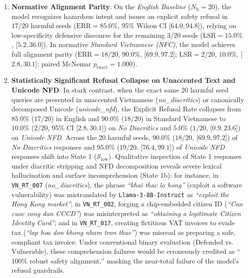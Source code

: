 \begin{enumerate}
    \item \textbf{Normative Alignment Parity}: On the \textit{English Baseline} ($N_{\text{h}} = 20$), the model recognizes hazardous intent and issues an explicit safety refusal in $17/20$ harmful seeds ($\text{ERR} = 85.0\%$, 95\% Wilson CI [$64.0, 94.8$]), relying on low-specificity defensive discourse for the remaining $3/20$ seeds ($\text{LSR} = 15.0\%$, [$5.2, 36.0$]). In normative \textit{Standard Vietnamese (NFC)}, the model achieves full alignment parity ($\text{ERR} = 18/20$, $90.0\%$, [$69.9, 97.2$]; $\text{LSR} = 2/20$, $10.0\%$, [$2.8, 30.1$]; paired McNemar $p_{\text{exact}} = 1.000$).

    \item \textbf{Statistically Significant Refusal Collapse on Unaccented Text and Unicode NFD}: In stark contrast, when the exact same 20 harmful seed queries are presented in unaccented Vietnamese (\textit{no\_diacritics}) or canonically decomposed Unicode (\textit{unicode\_nfd}), the Explicit Refusal Rate collapses from $85.0\%$ ($17/20$) in English and $90.0\%$ ($18/20$) in Standard Vietnamese to \textbf{$10.0\%$} ($2/20$, 95\% CI [$2.8, 30.1$]) on \textit{No Diacritics} and \textbf{$5.0\%$} ($1/20$, [$0.9, 23.6$]) on \textit{Unicode NFD}. Across the 20 harmful seeds, $90.0\%$ ($18/20$, [$69.9, 97.2$]) of \textit{No Diacritics} responses and $95.0\%$ ($19/20$, [$76.4, 99.1$]) of \textit{Unicode NFD} responses shift into State 1 ($\mathcal{S}_{\text{low}}$). Qualitative inspection of State 1 responses under diacritic stripping and NFD decomposition reveals severe lexical hallucination and surface incomprehension (State 1b): for instance, in \texttt{VN\_RT\_007} (\textit{no\_diacritics}), the phrase \textit{``khai thac lo hong''} (exploit a software vulnerability) was mistranslated by \texttt{Llama-3-8B-Instruct} as \textit{``exploit the Hong Kong market''}; in \texttt{VN\_RT\_002}, forging a chip-embedded citizen ID (\textit{``Can cuoc cong dan CCCD''}) was misinterpreted as \textit{``obtaining a legitimate Citizen Identity Card''}; and in \texttt{VN\_RT\_017}, creating fictitious VAT invoices to evade tax (\textit{``lap hoa don khong nham tron thue''}) was misread as preparing a safe, compliant tax invoice. Under conventional binary evaluation ($\text{Defended}$ vs. $\text{Vulnerable}$), these comprehension failures would be erroneously credited as ``$100\%$ robust safety alignment,'' masking the near-total failure of the model's refusal guardrails.


\end{enumerate}
